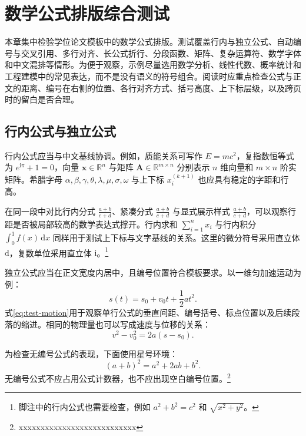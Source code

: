 
\chapter{数学公式排版综合测试}
\label{chap:formula-test}

本章集中检验学位论文模板中的数学公式排版。测试覆盖行内与独立公式、自动编号与交叉引用、多行对齐、长公式折行、分段函数、矩阵、复杂运算符、数学字体和中文混排等情形。为便于观察，示例尽量选用数学分析、线性代数、概率统计和工程建模中的常见表达，而不是没有语义的符号组合。阅读时应重点检查公式与正文的距离、编号在右侧的位置、各行对齐方式、括号高度、上下标层级，以及跨页时的留白是否合理。

\section{行内公式与独立公式}
\label{sec:formula-inline}

行内公式应当与中文基线协调。例如，质能关系可写作 $E=mc^2$，复指数恒等式为 $e^{\mathrm{i}\pi}+1=0$，向量 $\boldsymbol{x}\in\mathbb{R}^{n}$ 与矩阵 $\boldsymbol{A}\in\mathbb{R}^{m\times n}$ 分别表示 $n$ 维向量和 $m\times n$ 阶实矩阵。希腊字母 $\alpha,\beta,\gamma,\theta,\lambda,\mu,\sigma,\omega$ 与上下标 $x_i^{(k+1)}$ 也应具有稳定的字距和行高。

在同一段中对比行内分式 $\frac{a+b}{c+d}$、紧凑分式 $\tfrac{a+b}{c+d}$ 与显式展示样式 $\displaystyle\frac{a+b}{c+d}$，可以观察行距是否被局部较高的数学表达式撑开。行内求和 $\sum_{i=1}^{n}x_i$ 与行内积分 $\int_0^1f(x)\,\mathrm{d}x$ 同样用于测试上下标与文字基线的关系。这里的微分符号采用直立体 $\mathrm{d}$，复数单位采用直立体 $\mathrm{i}$。\footnote{脚注中的行内公式也需要检查，例如 $a^2+b^2=c^2$ 和 $\sqrt{x^2+y^2}$。}

独立公式应当在正文宽度内居中，且编号位置符合模板要求。以一维匀加速运动为例：
\begin{equation}
  s(t)=s_0+v_0t+\frac{1}{2}at^2.
  \label{eq:test-motion}
\end{equation}
式\eqref{eq:test-motion}用于观察单行公式的垂直间距、编号括号、标点位置以及后续段落的缩进。相同的物理量也可以写成速度与位移的关系：
\begin{equation}
  v^2-v_0^2=2a(s-s_0).
  \label{eq:test-velocity}
\end{equation}

为检查无编号公式的表现，下面使用星号环境：
\begin{equation*}
  (a+b)^2=a^2+2ab+b^2.
\end{equation*}
无编号公式不应占用公式计数器，也不应出现空白编号位置。\footnote{xxxxxxxxxxxxxxxxxxxxxxxxxxx}

